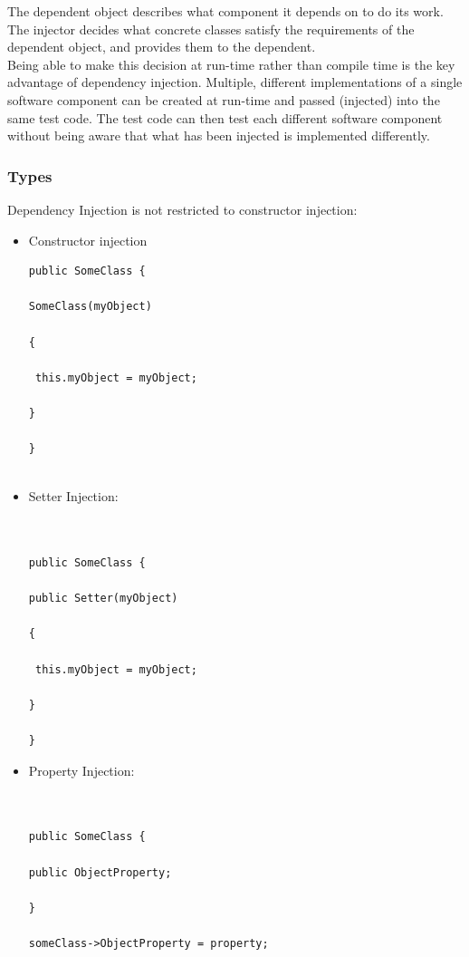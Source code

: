\documentclass[14pt,a4paper]{extreport}
\begin{document}
The dependent object describes what component it depends on to do its work. The injector decides what concrete classes satisfy the requirements of the dependent object, and provides them to the dependent.
\\

Being able to make this decision at run-time rather than compile time is the key advantage of dependency injection. Multiple, different implementations of a single software component can be created at run-time and passed (injected) into the same test code. The test code can then test each different software component without 
being aware that what has been injected is implemented differently.
			\subsubsection{Types}
			Dependency Injection is not restricted to constructor injection:

\begin{itemize}
\item Constructor injection
\begin{verbatim}
public SomeClass {

SomeClass(myObject)

{

 this.myObject = myObject;

}

}


\end{verbatim}
\item Setter Injection:
\begin{verbatim}


public SomeClass {

public Setter(myObject)

{

 this.myObject = myObject;

}

}
\end{verbatim}
\item  Property Injection:
\begin{verbatim}


public SomeClass {

public ObjectProperty;

}

someClass->ObjectProperty = property;
\end{verbatim}
\end{itemize}
\end{document}
